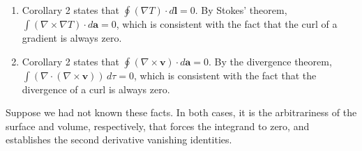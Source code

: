 \documentclass[a4paper]{article}
\begin{document}
\vspace{12pt}


\begin{enumerate}[label=(\alph*)]
	\item Corollary 2 states that \( \oint \!\left( \nabla T \right) \cdot d \pmb{l} = 0 \). By Stokes' theorem, \( \int \!\left( \nabla \times \nabla T \right) \cdot d \pmb{a} = 0 \), which is consistent with the fact that the curl of a gradient is always zero.
	\item Corollary 2 states that \( \oint \!\left( \nabla \times \pmb{v} \right) \cdot d \pmb{a} = 0 \). By the divergence theorem, \( \int \!\left( \nabla \cdot \!\left( \nabla \times \pmb{v} \right) \right) \, d \tau = 0 \), which is consistent with the fact that the divergence of a curl is always zero.
\end{enumerate}
Suppose we had not known these facts. In both cases, it is the arbitrariness of the surface and volume, respectively, that forces the integrand to zero, and establishes the second derivative vanishing identities.

\vspace{12pt}
\end{document}
